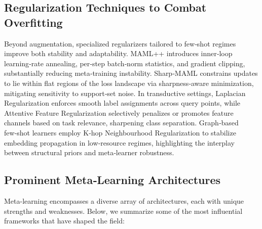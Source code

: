 \subsection{Regularization Techniques to Combat Overfitting}

Beyond augmentation, specialized regularizers tailored to few‑shot regimes improve both stability 
and adaptability. MAML++ \cite{antoniou2019howto} introduces inner‑loop learning‑rate annealing, 
per‑step batch‑norm statistics, and gradient clipping, substantially reducing meta‑training 
instability. Sharp‑MAML \cite{abbas2022sharp} constrains updates to lie within flat regions of 
the loss landscape via sharpness‑aware minimization, mitigating sensitivity to support‑set noise. 
In transductive settings, Laplacian Regularization \cite{ziko2020laplacian} enforces smooth label 
assignments across query points, while Attentive Feature Regularization \cite{zhu2024afr} 
selectively penalizes or promotes feature channels based on task relevance, sharpening class 
separation. Graph‑based few‑shot learners employ K‑hop Neighbourhood Regularization 
\cite{van2023fewshottextgcn} to stabilize embedding propagation in low‑resource regimes, 
highlighting the interplay between structural priors and meta‑learner robustness.

\subsection{Prominent Meta‑Learning Architectures}

Meta-learning encompasses a diverse array of architectures, each with unique strengths and weaknesses. Below, we summarize some of the most influential frameworks that have shaped the field:

